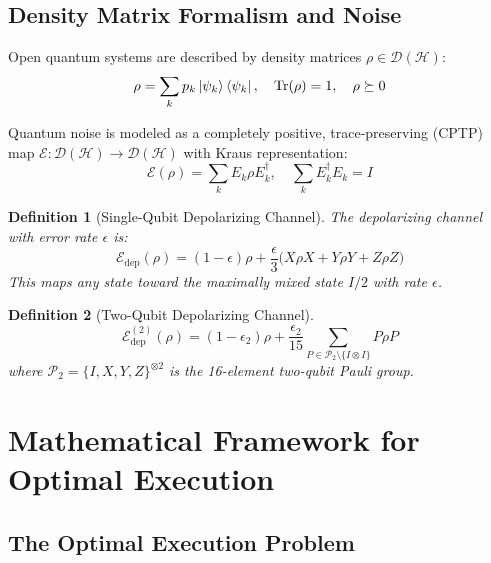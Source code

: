 \documentclass[11pt]{article}
\newcommand{\Hilbert}{\mathcal{H}}
\newcommand{\Density}{\mathcal{D}}
\newtheorem{definition}{Definition}
\begin{document}
\subsection{Density Matrix Formalism and Noise}

Open quantum systems are described by density matrices $\rho \in \Density(\Hilbert)$:
\begin{equation}
\rho = \sum_k p_k \ket{\psi_k}\bra{\psi_k}, \quad \mathrm{Tr}(\rho) = 1, \quad \rho \succeq 0
\end{equation}

Quantum noise is modeled as a completely positive, trace-preserving (CPTP) map $\mathcal{E}: \Density(\Hilbert) \to \Density(\Hilbert)$ with Kraus representation:
\begin{equation}
\mathcal{E}(\rho) = \sum_k E_k \rho E_k^\dagger, \quad \sum_k E_k^\dagger E_k = I
\label{eq:kraus}
\end{equation}

\begin{definition}[Single-Qubit Depolarizing Channel]
The depolarizing channel with error rate $\epsilon$ is:
\begin{equation}
\mathcal{E}_{\mathrm{dep}}(\rho) = (1-\epsilon)\rho + \frac{\epsilon}{3}\big(X\rho X + Y\rho Y + Z\rho Z\big)
\label{eq:depolarizing_1q}
\end{equation}
This maps any state toward the maximally mixed state $I/2$ with rate $\epsilon$.
\end{definition}

\begin{definition}[Two-Qubit Depolarizing Channel]
\begin{equation}
\mathcal{E}_{\mathrm{dep}}^{(2)}(\rho) = (1-\epsilon_2)\rho + \frac{\epsilon_2}{15}\sum_{P \in \mathcal{P}_2 \setminus \{I\otimes I\}} P\rho P
\label{eq:depolarizing_2q}
\end{equation}
where $\mathcal{P}_2 = \{I, X, Y, Z\}^{\otimes 2}$ is the 16-element two-qubit Pauli group.
\end{definition}


\section{Mathematical Framework for Optimal Execution}
\label{sec:math_foundations}

\subsection{The Optimal Execution Problem}
\end{document}

